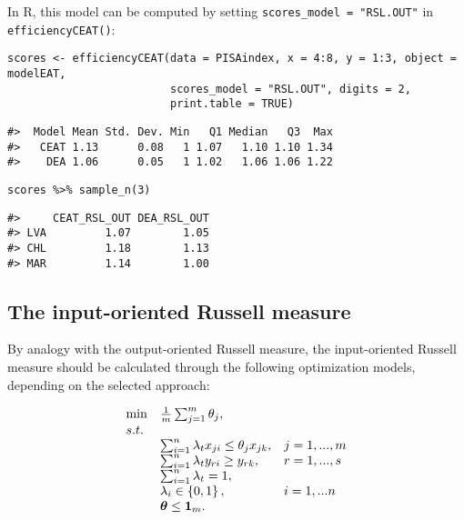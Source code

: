 In R, this model can be computed by setting \texttt{scores\_model\ =\ "RSL.OUT"} in \texttt{efficiencyCEAT()}:

\begin{verbatim}
scores <- efficiencyCEAT(data = PISAindex, x = 4:8, y = 1:3, object = modelEAT, 
                         scores_model = "RSL.OUT", digits = 2, 
                         print.table = TRUE)
\end{verbatim}

\begin{verbatim}
#>  Model Mean Std. Dev. Min   Q1 Median   Q3  Max
#>   CEAT 1.13      0.08   1 1.07   1.10 1.10 1.34
#>    DEA 1.06      0.05   1 1.02   1.06 1.06 1.22
\end{verbatim}

\begin{verbatim}
scores %>% sample_n(3)
\end{verbatim}

\begin{verbatim}
#>     CEAT_RSL_OUT DEA_RSL_OUT
#> LVA         1.07        1.05
#> CHL         1.18        1.13
#> MAR         1.14        1.00
\end{verbatim}

\hypertarget{the-input-oriented-russell-measure}{%
\subsection{The input-oriented Russell measure}\label{the-input-oriented-russell-measure}}

By analogy with the output-oriented Russell measure, the input-oriented Russell measure should be calculated through the following optimization models, depending on the selected approach:

\begin{equation} \label{(23)} 
\begin{array}{lllll} 
{} & {\min } & {\frac{1}{m} \sum_{j=1}^{m}\theta_{j},  } & {} & {} \\ 
{} & {s.t.} & {} & {} & {} \\ 
{} & {} & {\sum_{i=1}^{n}\lambda_{t} x_{ji} \le \theta_{j} x_{jk} ,} & {j=1,...,m} & {} \\ 
{} & {} & {\sum_{i=1}^{n}\lambda_{t} y_{ri} \ge y_{rk} ,} & {r=1,...,s} & {} \\ 
{} & {} & {\sum_{i=1}^{n}\lambda_{t}  =1,} & {} & {} \\ 
{} & {} & {\lambda_{i} \in \left\{0,1\right\},} & {i=1,...n} & {} \\ 
{} & {} & {{\it \boldsymbol{\theta}}\le {\bf 1}_{m}.} 
\end{array}
\end{equation}

